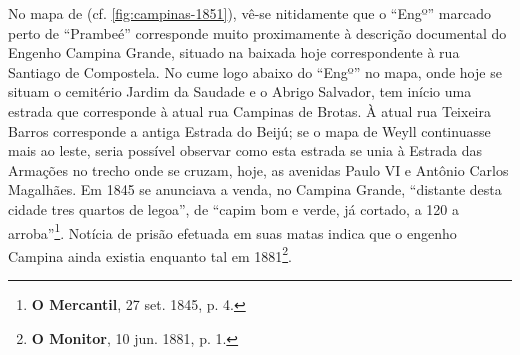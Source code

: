No mapa de  (cf. \autoref{fig:campinas-1851}), vê-se nitidamente que o ``Engº'' marcado perto de ``Prambeé'' corresponde muito proximamente à descrição documental do Engenho Campina Grande, situado na baixada hoje correspondente à rua Santiago de Compostela. No cume logo abaixo do ``Engº'' no mapa, onde hoje se situam  o cemitério Jardim da Saudade e o Abrigo Salvador, tem início uma estrada que corresponde à atual rua Campinas de Brotas. À atual rua Teixeira Barros corresponde a antiga Estrada do Beijú; se o mapa de Weyll continuasse mais ao leste, seria possível observar como esta estrada se unia à Estrada das Armações no trecho onde se cruzam, hoje, as avenidas Paulo VI e Antônio Carlos Magalhães. Em 1845 se anunciava a venda, no Campina Grande, ``distante desta cidade tres quartos de legoa'', de ``capim bom e verde, já cortado, a 120 a arroba''\footnote{\textbf{O Mercantil}, 27 set. 1845, p. 4.}. Notícia de prisão efetuada em suas matas indica que o engenho Campina ainda existia enquanto tal em 1881\footnote{\textbf{O Monitor}, 10 jun. 1881, p. 1.}.

